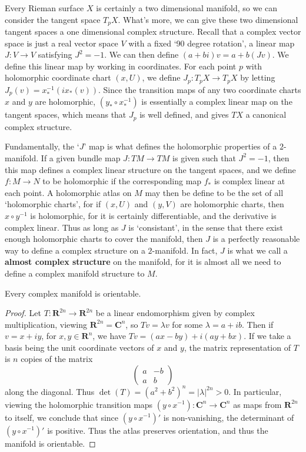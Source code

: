 Every Rieman surface $X$ is certainly a two dimensional manifold, so we can consider the tangent space $T_p X$. What's more, we can give these two dimensional tangent spaces a one dimensional complex structure. Recall that a complex vector space is just a real vector space $V$ with a fixed `90 degree rotation', a linear map $J: V \to V$ satisfying $J^2 = -1$. We can then define $(a + bi)v = a + b(Jv)$. We define this linear map by working in coordinates. For each point $p$ with holomorphic coordinate chart $(x,U)$, we define $J_p: T_p X \to T_p X$ by letting $J_p(v) = x_*^{-1}(ix_*(v))$. Since the transition maps of any two coordinate charts $x$ and $y$ are holomorphic, $(y_* \circ x_*^{-1})$ is essentially a complex linear map on the tangent spaces, which means that $J_p$ is well defined, and gives $TX$ a canonical complex structure.

\begin{remark}
    Fundamentally, the `$J$' map is what defines the holomorphic properties of a $2$-manifold. If a given bundle map $J:TM \to TM$ is given such that $J^2 = -1$, then this map defines a complex linear structure on the tangent spaces, and we define $f: M \to N$ to be holomorphic if the corresponding map $f_*$ is complex linear at each point. A holomorphic atlas on $M$ may then be define to be the set of all `holomorphic charts', for if $(x,U)$ and $(y,V)$ are holomorphic charts, then $x \circ y^{-1}$ is holomorphic, for it is certainly differentiable, and the derivative is complex linear. Thus as long as $J$ is `consistant', in the sense that there exist enough holomorphic charts to cover the manifold, then $J$ is a perfectly reasonable way to define a complex structure on a $2$-manifold. In fact, $J$ is what we call a {\bf almost complex structure} on the manifold, for it is almost all we need to define a complex manifold structure to $M$.
\end{remark}

\begin{theorem}
    Every complex manifold is orientable.
\end{theorem}
\begin{proof}
    Let $T: \mathbf{R}^{2n} \to \mathbf{R}^{2n}$ be a linear endomorphism given by complex multiplication, viewing $\mathbf{R}^{2n} = \mathbf{C}^n$, so $Tv = \lambda v$ for some $\lambda = a + ib$. Then if $v = x + iy$, for $x,y \in \mathbf{R}^n$, we have $Tv = (ax - by) + i(ay + bx)$. If we take a basis being the unit coordinate vectors of $x$ and $y$, the matrix representation of $T$ is $n$ copies of the matrix
    \[ \begin{pmatrix} a & -b \\ a & b \end{pmatrix} \]
    along the diagonal. Thus $\det(T) = (a^2 + b^2)^n = |\lambda|^{2n} > 0$. In particular, viewing the holomorphic transition maps $(y \circ x^{-1}): \mathbf{C}^n \to \mathbf{C}^n$ as maps from $\mathbf{R}^{2n}$ to itself, we conclude that since $(y \circ x^{-1})'$ is non-vanishing, the determinant of $(y \circ x^{-1})'$ is positive. Thus the atlas preserves orientation, and thus the manifold is orientable.
\end{proof}

